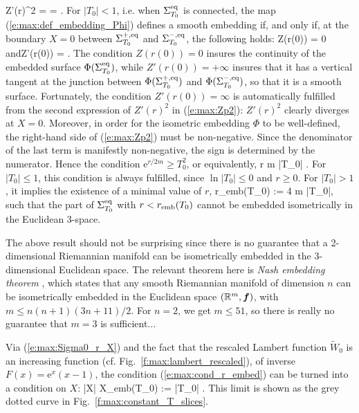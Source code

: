     Z'(r)^2 =  =
     .
\ee
For $|T_0|<1$, i.e. when $\Sigma_{T_0}^{\rm eq}$ is connected, the
map (\ref{e:max:def_embedding_Phi}) defines a smooth embedding if, and only
if, at the boundary $X=0$ between $\Sigma_{T_0}^{+,\rm eq}$ and
$\Sigma_{T_0}^{-,\rm eq}$, the following holds:
\be
    Z(r(0)) = 0 \quad\mbox{and}\quad Z'(r(0)) = \infty .
\ee
The condition $Z(r(0)) = 0$ insures the continuity of the embedded surface
$\Phi(\Sigma_{T_0}^{\rm eq})$,
while $Z'(r(0)) = +\infty$ insures that it has a vertical tangent at
the junction between $\Phi(\Sigma_{T_0}^{+,\rm eq})$ and
$\Phi(\Sigma_{T_0}^{-,\rm eq})$, so that it is
a smooth surface. Fortunately, the condition $Z'(r(0)) = \infty$
is automatically fulfilled from the second expression of
$Z'(r)^2$ in (\ref{e:max:Zp2}): $Z'(r)^2$ clearly diverges at $X=0$.
Moreover, in order for the isometric embedding $\Phi$ to be well-defined, the right-hand side
of (\ref{e:max:Zp2}) must be non-negative. Since the denominator of the last
term is manifestly non-negative, the sign is determined by the numerator. Hence
the condition $\mathrm{e}^{r/2m} \geq T_0^2$, or equivalently,
\be \label{e:max:cond_r_embed}
    r  m \ln |T_0| .
\ee
For $|T_0|\leq 1$, this condition is always fulfilled, since $\ln |T_0| \leq 0$
and $r \geq 0$. For $|T_0| > 1$, it implies the existence of a minimal value
of $r$,
\be \label{e:max:r_emb}
    r_{\rm emb}(T_0) :=  4 m \ln |T_0|,
\ee
such that the part of $\Sigma_{T_0}^{\rm eq}$ with $r< r_{\rm emb}(T_0)$
cannot be embedded isometrically in the Euclidean 3-space.
\begin{remark}
The above result should not be surprising since there is
no guarantee that a 2-dimensional Riemannian manifold can
be isometrically embedded in the 3-dimensional Euclidean space.
The relevant theorem here is \emph{Nash embedding theorem} \cite{Nash56}, which
states that any smooth Riemannian manifold of dimension $n$ can be isometrically
embedded in the Euclidean space $(\mathbb{R}^m,\bm{f})$, with $m \leq n(n+1)(3n+11)/2$.
For $n=2$, we get $m\leq 51$, so there is really no guarantee that $m=3$
is sufficient...
\end{remark}

Via (\ref{e:max:Sigma0_r_X}) and the fact that the rescaled Lambert function
$\tilde{W}_0$ is an increasing function (cf. Fig.~\ref{f:max:lambert_rescaled}), of inverse $F(x)=\mathrm{e}^x(x-1)$,
the condition (\ref{e:max:cond_r_embed}) can be turned into a condition
on $X$:
\be
    |X| \geq X_{\rm emb}(T_0) := |T_0|  .
\ee
This limit is shown as the grey dotted curve in Fig.~\ref{f:max:constant_T_slices}.

